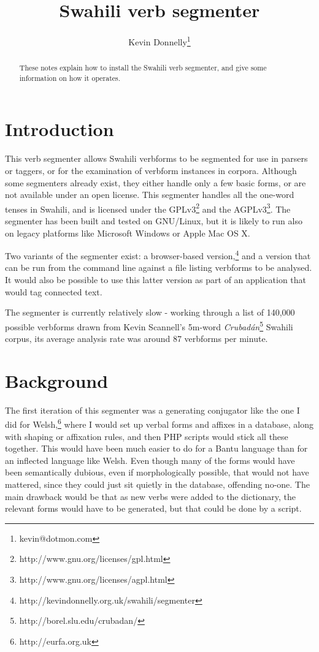 \documentclass[a4paper,10pt]{article}
\title{\textbf{Swahili verb segmenter}}
\author{Kevin Donnelly\thanks{kevin@dotmon.com}}
\date{}
\begin{document}
\maketitle

\begin{abstract}
These notes explain how to install the Swahili verb segmenter, and give some information on how it operates.
\end{abstract}

\section{Introduction}

This verb segmenter allows Swahili verbforms to be segmented for use in parsers or taggers, or for the examination of verbform instances in corpora. Although some segmenters already exist, they either handle only a few basic forms, or are not available under an open license. This segmenter handles all the one-word tenses in Swahili, and is licensed under the GPLv3\footnote{http://www.gnu.org/licenses/gpl.html} and the AGPLv3\footnote{http://www.gnu.org/licenses/agpl.html}.  The segmenter has been built and tested on GNU/Linux, but it is likely to run also on legacy platforms like Microsoft Windows or Apple Mac OS X.

Two variants of the segmenter exist: a browser-based version,\footnote{http://kevindonnelly.org.uk/swahili/segmenter} and a version that can be run from the command line against a file listing verbforms to be analysed. It would also be possible to use this latter version as part of an application that would tag connected text.

The segmenter is currently relatively slow - working through a list of 140,000 possible verbforms drawn from Kevin Scannell's 5m-word \textit{Crubadán}\footnote{http://borel.slu.edu/crubadan/} Swahili corpus, its average analysis rate was around 87 verbforms per minute.

\section{Background}

The first iteration of this segmenter was a generating conjugator like the one I did for Welsh,\footnote{http://eurfa.org.uk} where I would set up verbal forms and affixes in a database, along with shaping or affixation rules, and then PHP scripts would stick all these together. This would have been much easier to do for a Bantu language than for an inflected language like Welsh. Even though many of the forms would have been semantically dubious, even if morphologically possible, that would not have mattered, since they could just sit quietly in the database, offending no-one. The main drawback would be that as new verbs were added to the dictionary, the relevant forms would have to be generated, but that could be done by a script.
\end{document}
